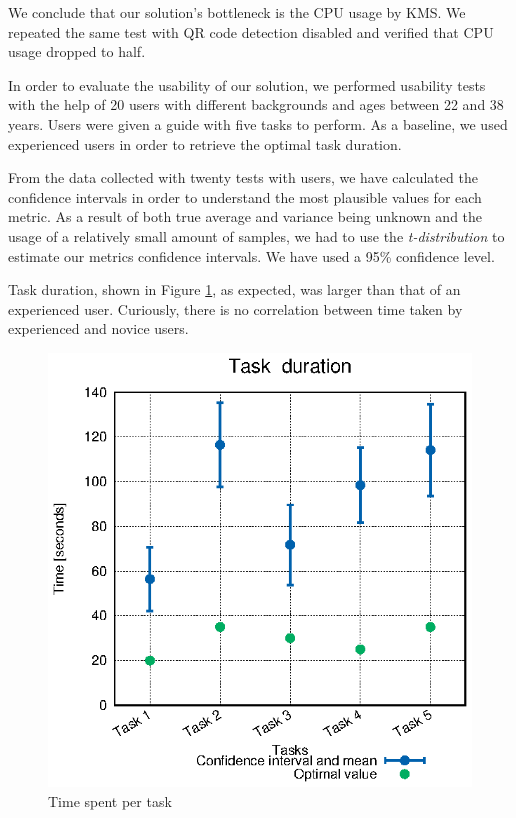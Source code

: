 \documentclass[10pt,conference]{IEEEtran}
\begin{document}
We conclude that our solution's bottleneck is the \gls{CPU} usage by \gls{KMS}.
We repeated the same test with \gls{QR} code detection disabled and verified that \gls{CPU} usage dropped to half.




In order to evaluate the usability of our solution, we performed usability tests with the help of 20 users with different backgrounds and ages between 22 and 38 years. 
Users were given a guide with five tasks to perform.
As a baseline, we used experienced users in order to retrieve the optimal task duration.


From the data collected with twenty tests with users, we have calculated the confidence intervals in order to understand the most plausible values for each metric.
As a result of both true average and variance being unknown and the usage of a relatively small amount of samples, we had to use the \emph{t-distribution} to estimate our metrics confidence intervals.
We have used a 95\% confidence level.

Task duration, shown in Figure \ref{fig:user_times}, as expected, was larger than that of an experienced user.
Curiously, there is no correlation between time taken by experienced and novice users.

\begin{figure}
  \centering
    \includegraphics[width=0.75\linewidth]{stats/user_times.eps}
    \caption{Time spent per task}
    \label{fig:user_times}
\end{figure}
\end{document}
